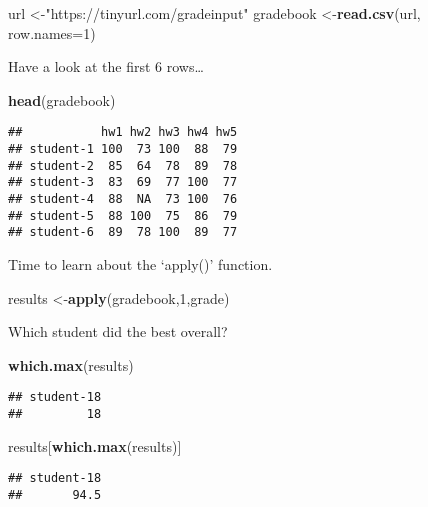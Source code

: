 \documentclass[
]{article}
\newenvironment{Shaded}{\begin{snugshade}}{\end{snugshade}}
\newcommand{\DataTypeTok}[1]{\textcolor[rgb]{0.13,0.29,0.53}{#1}}
\newcommand{\DecValTok}[1]{\textcolor[rgb]{0.00,0.00,0.81}{#1}}
\newcommand{\KeywordTok}[1]{\textcolor[rgb]{0.13,0.29,0.53}{\textbf{#1}}}
\newcommand{\NormalTok}[1]{#1}
\newcommand{\StringTok}[1]{\textcolor[rgb]{0.31,0.60,0.02}{#1}}
\begin{document}
\begin{Shaded}
\begin{Highlighting}[]
\NormalTok{url <-}\StringTok{"https://tinyurl.com/gradeinput"}
\NormalTok{gradebook <-}\KeywordTok{read.csv}\NormalTok{(url, }\DataTypeTok{row.names=}\DecValTok{1}\NormalTok{)}
\end{Highlighting}
\end{Shaded}

Have a look at the first 6 rows\ldots{}

\begin{Shaded}
\begin{Highlighting}[]
\KeywordTok{head}\NormalTok{(gradebook)}
\end{Highlighting}
\end{Shaded}

\begin{verbatim}
##           hw1 hw2 hw3 hw4 hw5
## student-1 100  73 100  88  79
## student-2  85  64  78  89  78
## student-3  83  69  77 100  77
## student-4  88  NA  73 100  76
## student-5  88 100  75  86  79
## student-6  89  78 100  89  77
\end{verbatim}

Time to learn about the `apply()' function.

\begin{Shaded}
\begin{Highlighting}[]
\NormalTok{results <-}\KeywordTok{apply}\NormalTok{(gradebook,}\DecValTok{1}\NormalTok{,grade)}
\end{Highlighting}
\end{Shaded}

Which student did the best overall?

\begin{Shaded}
\begin{Highlighting}[]
\KeywordTok{which.max}\NormalTok{(results)}
\end{Highlighting}
\end{Shaded}

\begin{verbatim}
## student-18 
##         18
\end{verbatim}

\begin{Shaded}
\begin{Highlighting}[]
\NormalTok{results[}\KeywordTok{which.max}\NormalTok{(results)]}
\end{Highlighting}
\end{Shaded}

\begin{verbatim}
## student-18 
##       94.5
\end{verbatim}
\end{document}
